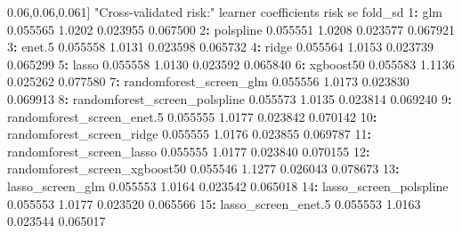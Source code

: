 \documentclass[12pt, krantz2,]{krantz}
\newenvironment{Shaded}{\begin{snugshade}}{\end{snugshade}}
\newcommand{\DecValTok}[1]{\textcolor[rgb]{0.06,0.06,0.06}{#1}}
\newcommand{\FloatTok}[1]{\textcolor[rgb]{0.06,0.06,0.06}{#1}}
\newcommand{\NormalTok}[1]{#1}
\newcommand{\OperatorTok}[1]{\textcolor[rgb]{0.43,0.43,0.43}{\textbf{#1}}}
\newcommand{\StringTok}[1]{\textcolor[rgb]{0.5,0.5,0.5}{#1}}
\theoremstyle{definition}
\theoremstyle{definition}
\theoremstyle{definition}
\newcommand{\1}{\mathbbm{1}}
\begin{document}
\begin{Shaded}
\begin{Highlighting}[]
\NormalTok{[}\DecValTok{1}\NormalTok{] }\StringTok{"Cross-validated risk:"}
\NormalTok{                          learner coefficients   risk       se  fold_sd}
 \DecValTok{1}\OperatorTok{:}\StringTok{                           }\NormalTok{glm     }\FloatTok{0.055565} \FloatTok{1.0202} \FloatTok{0.023955} \FloatTok{0.067500}
 \DecValTok{2}\OperatorTok{:}\StringTok{                     }\NormalTok{polspline     }\FloatTok{0.055551} \FloatTok{1.0208} \FloatTok{0.023577} \FloatTok{0.067921}
 \DecValTok{3}\OperatorTok{:}\StringTok{                        }\NormalTok{enet}\FloatTok{.5}     \FloatTok{0.055558} \FloatTok{1.0131} \FloatTok{0.023598} \FloatTok{0.065732}
 \DecValTok{4}\OperatorTok{:}\StringTok{                         }\NormalTok{ridge     }\FloatTok{0.055564} \FloatTok{1.0153} \FloatTok{0.023739} \FloatTok{0.065299}
 \DecValTok{5}\OperatorTok{:}\StringTok{                         }\NormalTok{lasso     }\FloatTok{0.055558} \FloatTok{1.0130} \FloatTok{0.023592} \FloatTok{0.065840}
 \DecValTok{6}\OperatorTok{:}\StringTok{                     }\NormalTok{xgboost50     }\FloatTok{0.055583} \FloatTok{1.1136} \FloatTok{0.025262} \FloatTok{0.077580}
 \DecValTok{7}\OperatorTok{:}\StringTok{       }\NormalTok{randomforest_screen_glm     }\FloatTok{0.055556} \FloatTok{1.0173} \FloatTok{0.023830} \FloatTok{0.069913}
 \DecValTok{8}\OperatorTok{:}\StringTok{ }\NormalTok{randomforest_screen_polspline     }\FloatTok{0.055573} \FloatTok{1.0135} \FloatTok{0.023814} \FloatTok{0.069240}
 \DecValTok{9}\OperatorTok{:}\StringTok{    }\NormalTok{randomforest_screen_enet}\FloatTok{.5}     \FloatTok{0.055555} \FloatTok{1.0177} \FloatTok{0.023842} \FloatTok{0.070142}
\DecValTok{10}\OperatorTok{:}\StringTok{     }\NormalTok{randomforest_screen_ridge     }\FloatTok{0.055555} \FloatTok{1.0176} \FloatTok{0.023855} \FloatTok{0.069787}
\DecValTok{11}\OperatorTok{:}\StringTok{     }\NormalTok{randomforest_screen_lasso     }\FloatTok{0.055555} \FloatTok{1.0177} \FloatTok{0.023840} \FloatTok{0.070155}
\DecValTok{12}\OperatorTok{:}\StringTok{ }\NormalTok{randomforest_screen_xgboost50     }\FloatTok{0.055546} \FloatTok{1.1277} \FloatTok{0.026043} \FloatTok{0.078673}
\DecValTok{13}\OperatorTok{:}\StringTok{              }\NormalTok{lasso_screen_glm     }\FloatTok{0.055553} \FloatTok{1.0164} \FloatTok{0.023542} \FloatTok{0.065018}
\DecValTok{14}\OperatorTok{:}\StringTok{        }\NormalTok{lasso_screen_polspline     }\FloatTok{0.055553} \FloatTok{1.0177} \FloatTok{0.023520} \FloatTok{0.065566}
\DecValTok{15}\OperatorTok{:}\StringTok{           }\NormalTok{lasso_screen_enet}\FloatTok{.5}     \FloatTok{0.055553} \FloatTok{1.0163} \FloatTok{0.023544} \FloatTok{0.065017}

\end{Highlighting}
\end{Shaded}
\end{document}
